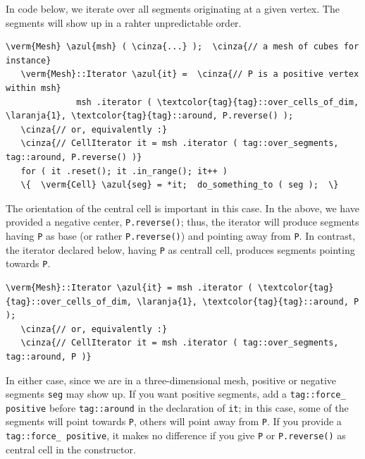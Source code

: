 In code below, we iterate over all segments originating at a given vertex.
The segments will show up in a rahter unpredictable order.

\begin{Verbatim}[commandchars=\\\{\},formatcom=\small\tt,
   baselinestretch=0.94,framesep=2mm                      ]
   \verm{Mesh} \azul{msh} ( \cinza{...} );  \cinza{// a mesh of cubes for instance}
   \verm{Mesh}::Iterator \azul{it} =  \cinza{// P is a positive vertex within msh}
              msh .iterator ( \textcolor{tag}{tag}::over_cells_of_dim, \laranja{1}, \textcolor{tag}{tag}::around, P.reverse() );
   \cinza{// or, equivalently :}
   \cinza{// CellIterator it = msh .iterator ( tag::over_segments, tag::around, P.reverse() )}
   for ( it .reset(); it .in_range(); it++ )
   \{  \verm{Cell} \azul{seg} = *it;  do_something_to ( seg );  \}
\end{Verbatim}

The orientation of the central cell is important in this case.
In the above, we have provided a negative center, {\small\tt P.reverse()};
thus, the iterator will produce segments {\small\tt{}} having {\small\tt P} as base
(or rather {\small\tt P.reverse()}) and pointing away from {\small\tt P}.
In contrast, the iterator declared below, having {\small\tt P} as centrall cell,
produces segments pointing towards {\small\tt P}.

\begin{Verbatim}[commandchars=\\\{\},formatcom=\small\tt,
   baselinestretch=0.94,framesep=2mm                      ]
   \verm{Mesh}::Iterator \azul{it} = msh .iterator ( \textcolor{tag}{tag}::over_cells_of_dim, \laranja{1}, \textcolor{tag}{tag}::around, P );
   \cinza{// or, equivalently :}
   \cinza{// CellIterator it = msh .iterator ( tag::over_segments, tag::around, P )}
\end{Verbatim}

In either case, since we are in a three-dimensional mesh, positive or negative segments
{\small\tt seg} may show up.
If you want positive segments, add a {\small\tt\textcolor{tag}{tag}::force\_\,positive} before
{\small\tt\textcolor{tag}{tag}::around} in the declaration of {\small\tt it};
in this case, some of the segments will point towards {\small\tt P},
others will point away from {\small\tt P}.
If you provide a {\small\tt\textcolor{tag}{tag}::force\_\,positive}, it makes no difference
if you give {\small\tt P} or {\small\tt P.reverse()} as central cell in the constructor.

